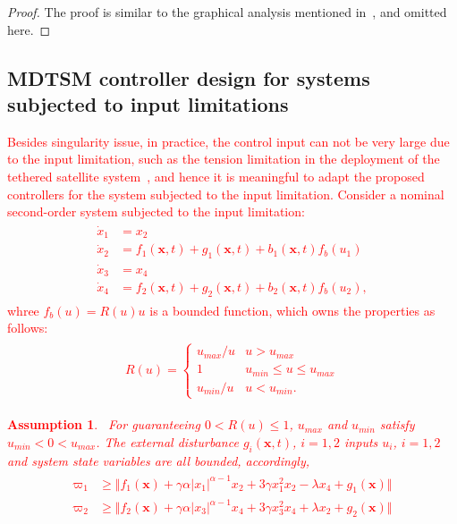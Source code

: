 \documentclass[3p]{elsarticle}
\theoremstyle{plain}
\newtheorem{myas}{Assumption}
\theoremstyle{remark}
\begin{document}
\begin{proof}
The proof is similar to the graphical analysis mentioned in~\cite{feng2013nonsingular}, and omitted here.
\end{proof}
\subsection{MDTSM controller design for systems subjected to input limitations}
\textcolor{red}{
Besides singularity issue, in practice, the control input can not be very large due to the input limitation, such as the tension limitation in the deployment of the tethered satellite system~\cite{Ma201667}, and hence it is meaningful to adapt the proposed controllers for the system subjected to the input limitation. Consider a nominal second-order system subjected to the input limitation:
\begin{align}
\begin{split}
\dot x_1 &= x_2\\
\dot x_2 &= f_1(\bm x,t)+g_1(\bm x,t)+b_1(\bm x,t)f_b(u_1)\\
\dot x_3 &= x_4\\
\dot x_4 &= f_2(\bm x,t)+g_2(\bm x,t)+b_2(\bm x,t)f_b(u_2),\label{eq:second-order system subjected to limitation}
\end{split}
\end{align}
whree $f_b(u) = R(u)u$ is a bounded function, which owns the properties as follows:
\begin{align}\begin{split}
  R(u)=\begin{cases}
  u_{max}/u &u>u_{max}\\
  1&u_{min}\le u\le u_{max}\\
  u_{min}/u& u<u_{min}.
\end{cases}\end{split}
\end{align}
\begin{myas}~\cite{Ma201667}\label{myas:1}
For guaranteeing $0<R(u)\le 1$, $u_{max}$ and $u_{min}$ satisfy $u_{min}<0<u_{max}$. The external disturbance $g_i(\bm x,t)$, $i=1,2$ inputs $u_i$, $i=1,2$ and system state variables are all bounded, accordingly,
\begin{align}\begin{split}
  \varpi_1 &\ge \Vert f_1(\bm x)+\gamma\alpha\vert x_1\vert^{\alpha-1}x_2+3\gamma x_1^2x_2-\lambda x_4+g_1(\bm x)\Vert\\
  \varpi_2 &\ge \Vert f_2(\bm x)+\gamma\alpha\vert x_3\vert^{\alpha-1}x_4+3\gamma x_3^2x_4+\lambda x_2+g_2(\bm x)\Vert\\

\end{split}
\end{align}
\end{myas}}
\end{document}
